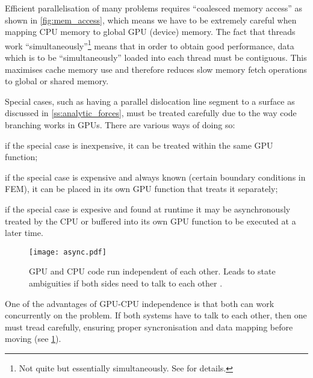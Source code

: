 Efficient parallelisation of many problems requires ``coalesced memory access'' as shown in \cref{fig:mem_access}, which means we have to be extremely careful when mapping CPU memory to global GPU (device) memory. The fact that threads work ``simultaneously''\footnote{Not quite but essentially simultaneously. See \cite{nvidia} for details.} means that in order to obtain good performance, data which is to be ``simultaneously'' loaded into each thread must be contiguous. This maximises cache memory use and therefore reduces slow memory fetch operations to global or shared memory.

Special cases, such as having a parallel dislocation line segment to a surface as discussed in \cref{ss:analytic_forces}, must be treated carefully due to the way code branching works in GPUs. There are various ways of doing so:
\begin{inparaenum}[\itshape 1\upshape)]
	\item if the special case is inexpensive, it can be treated within the same GPU function;
	\item if the special case is expensive and always known (certain boundary conditions in FEM), it can be placed in its own GPU function that treats it separately;
	\item if the special case is expesive and found at runtime it may be asynchronously treated by the CPU or buffered into its own GPU function to be executed at a later time.
\end{inparaenum}

\begin{figure}[t]
	\centering
	\texttt{[image: async.pdf]}
	\caption[GPU and CPU asynchronous execution.]{GPU and CPU code run independent of each other. Leads to state ambiguities if both sides need to talk to each other \cite{nvidia}.}
	\label{fig:async_gpu_cpu}
\end{figure}
One of the advantages of GPU-CPU independence is that both can work concurrently on the problem. If both systems have to talk to each other, then one must tread carefully, ensuring proper syncronisation and data mapping before moving (see \cref{fig:async_gpu_cpu}).

